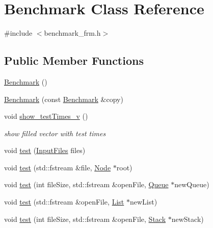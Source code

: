 \hypertarget{class_benchmark}{}\section{Benchmark Class Reference}
\label{class_benchmark}


{\ttfamily \#include $<$benchmark\+\_\+frm.\+h$>$}

\subsection*{Public Member Functions}
\begin{DoxyCompactItemize}
\item 
\hyperlink{class_benchmark_acfca497989836a688d44477802e822d8}{Benchmark} ()
\item 
\hyperlink{class_benchmark_ae9237b5fd5cac90bdcc953837e8aee1a}{Benchmark} (const \hyperlink{class_benchmark}{Benchmark} \&copy)
\item 
void \hyperlink{class_benchmark_a973fa2d47ed4383e23dd710de955b03b}{show\+\_\+test\+Times\+\_\+v} ()
\begin{DoxyCompactList}\small\item\em show filled vector with test times \end{DoxyCompactList}\item 
void \hyperlink{class_benchmark_a4107fff4e0da31d561fc6109e359b341}{test} (\hyperlink{class_input_files}{Input\+Files} files)
\item 
void \hyperlink{class_benchmark_a4143fd45a2d12adaab64820a54d446a1}{test} (std\+::fstream \&file, \hyperlink{class_node}{Node} $\ast$root)
\item 
void \hyperlink{class_benchmark_a6fafa73a98bc705879c1cf369244b91a}{test} (int file\+Size, std\+::fstream \&open\+File, \hyperlink{class_queue}{Queue} $\ast$new\+Queue)
\item 
void \hyperlink{class_benchmark_a700cf39637091962d47c6c6ac0a1ecca}{test} (std\+::fstream \&open\+File, \hyperlink{class_list}{List} $\ast$new\+List)
\item 
void \hyperlink{class_benchmark_acbb9f8719dd94407c114683c88a2170d}{test} (int file\+Size, std\+::fstream \&open\+File, \hyperlink{class_stack}{Stack} $\ast$new\+Stack)
\end{DoxyCompactItemize}
